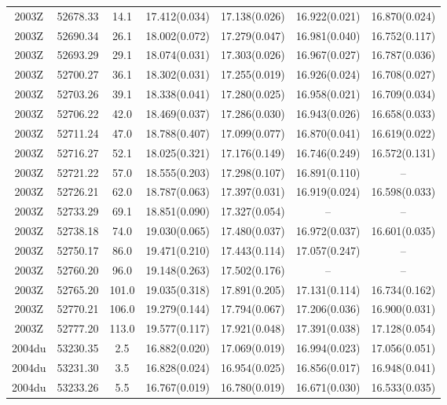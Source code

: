 \begin{table*}
\begin{tabular}{ccccccc}
2003Z	  & 52678.33	 & 14.1	& 17.412(0.034)	 & 17.138(0.026)	 & 16.922(0.021)	 & 16.870(0.024) \\ 
2003Z	  & 52690.34	 & 26.1	& 18.002(0.072)	 & 17.279(0.047)	 & 16.981(0.040)	 & 16.752(0.117) \\ 
2003Z	  & 52693.29	 & 29.1	& 18.074(0.031)	 & 17.303(0.026)	 & 16.967(0.027)	 & 16.787(0.036) \\ 
2003Z	  & 52700.27	 & 36.1	& 18.302(0.031)	 & 17.255(0.019)	 & 16.926(0.024)	 & 16.708(0.027) \\ 
2003Z	  & 52703.26	 & 39.1	& 18.338(0.041)	 & 17.280(0.025)	 & 16.958(0.021)	 & 16.709(0.034) \\ 
2003Z	  & 52706.22	 & 42.0	& 18.469(0.037)	 & 17.286(0.030)	 & 16.943(0.026)	 & 16.658(0.033) \\ 
2003Z	  & 52711.24	 & 47.0	& 18.788(0.407)	 & 17.099(0.077)	 & 16.870(0.041)	 & 16.619(0.022) \\ 
2003Z	  & 52716.27	 & 52.1	& 18.025(0.321)	 & 17.176(0.149)	 & 16.746(0.249)	 & 16.572(0.131) \\ 
2003Z	  & 52721.22	 & 57.0	& 18.555(0.203)	 & 17.298(0.107)	 & 16.891(0.110)	 & -- \\ 
2003Z	  & 52726.21	 & 62.0	& 18.787(0.063)	 & 17.397(0.031)	 & 16.919(0.024)	 & 16.598(0.033) \\ 
2003Z	  & 52733.29	 & 69.1	& 18.851(0.090)	 & 17.327(0.054)	 & --	 & -- \\ 
2003Z	  & 52738.18	 & 74.0	& 19.030(0.065)	 & 17.480(0.037)	 & 16.972(0.037)	 & 16.601(0.035) \\ 
2003Z	  & 52750.17	 & 86.0	& 19.471(0.210)	 & 17.443(0.114)	 & 17.057(0.247)	 & -- \\ 
2003Z	  & 52760.20	 & 96.0	& 19.148(0.263)	 & 17.502(0.176)	 & --	 & -- \\ 
2003Z	  & 52765.20	 & 101.0	& 19.035(0.318)	 & 17.891(0.205)	 & 17.131(0.114)	 & 16.734(0.162) \\ 
2003Z	  & 52770.21	 & 106.0	& 19.279(0.144)	 & 17.794(0.067)	 & 17.206(0.036)	 & 16.900(0.031) \\ 
2003Z	  & 52777.20	 & 113.0	& 19.577(0.117)	 & 17.921(0.048)	 & 17.391(0.038)	 & 17.128(0.054) \\ 
2004du	  & 53230.35	 & 2.5	& 16.882(0.020)	 & 17.069(0.019)	 & 16.994(0.023)	 & 17.056(0.051) \\ 
2004du	  & 53231.30	 & 3.5	& 16.828(0.024)	 & 16.954(0.025)	 & 16.856(0.017)	 & 16.948(0.041) \\ 
2004du	  & 53233.26	 & 5.5	& 16.767(0.019)	 & 16.780(0.019)	 & 16.671(0.030)	 & 16.533(0.035) \\ 

\end{tabular}
\end{table*}
